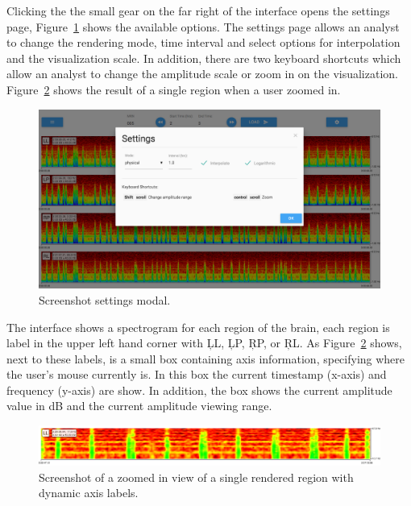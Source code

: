 Clicking the the small gear on the far right of the interface opens the
settings page, Figure~\ref{fig:settings} shows the available options. The
settings page allows an analyst to change the rendering mode, time interval and
select options for interpolation and the visualization scale. In addition,
there are two keyboard shortcuts which allow an analyst to change the amplitude
scale or zoom in on the visualization. Figure~\ref{fig:zoomed-region} shows the
result of a single region when a user zoomed in. \\

\begin{figure}[h]
\begin{center}
\includegraphics[scale=0.35]{./img/settings.png}
\caption{Screenshot settings modal.}
\label{fig:settings}
\end{center}
\end{figure}

The interface shows a spectrogram for each region of the brain, each region is
label in the upper left hand corner with \c{LL}, \c{LP}, \c{RP}, or \c{RL}.  As
Figure~\ref{fig:zoomed-region} shows, next to these labels, is a small box
containing axis information, specifying where the user's mouse currently is. In
this box the current timestamp (x-axis) and frequency (y-axis) are show. In
addition, the box shows the current amplitude value in dB and the current
amplitude viewing range. \\

\begin{figure}[h]
\begin{center}
\includegraphics[scale=0.35]{./img/zoomed-region.png}
\caption{Screenshot of a zoomed in view of a single rendered region with
  dynamic axis labels.}
\label{fig:zoomed-region}
\end{center}
\end{figure}

